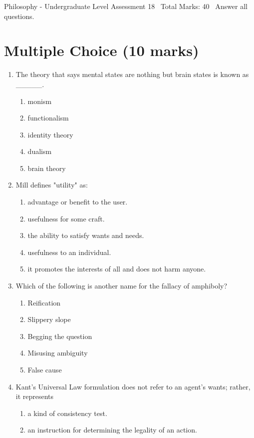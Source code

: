 \documentclass[12pt]{article}
\begin{document}
\begin{center}
Philosophy - Undergraduate Level Assessment 18 \
Total Marks: 40 \
Answer all questions.
\end{center}

\section*{Multiple Choice (10 marks)}
\begin{enumerate}[label=\arabic*.]
\item The theory that says mental states are nothing but brain states is known as \_\_\_\_\_.
\begin{enumerate}[label=(\alph*)]
    \item monism
    \item functionalism
    \item identity theory
    \item dualism
    \item brain theory
\end{enumerate}
\item Mill defines "utility" as:
\begin{enumerate}[label=(\alph*)]
    \item advantage or benefit to the user.
    \item usefulness for some craft.
    \item the ability to satisfy wants and needs.
    \item usefulness to an individual.
    \item it promotes the interests of all and does not harm anyone.
\end{enumerate}
\item Which of the following is another name for the fallacy of amphiboly?
\begin{enumerate}[label=(\alph*)]
    \item Reification
    \item Slippery slope
    \item Begging the question
    \item Misusing ambiguity
    \item False cause
\end{enumerate}
\item Kant's Universal Law formulation does not refer to an agent's wants; rather, it represents
\begin{enumerate}[label=(\alph*)]
    \item a kind of consistency test.
    \item an instruction for determining the legality of an action.

\end{enumerate}
\end{enumerate}
\end{document}
